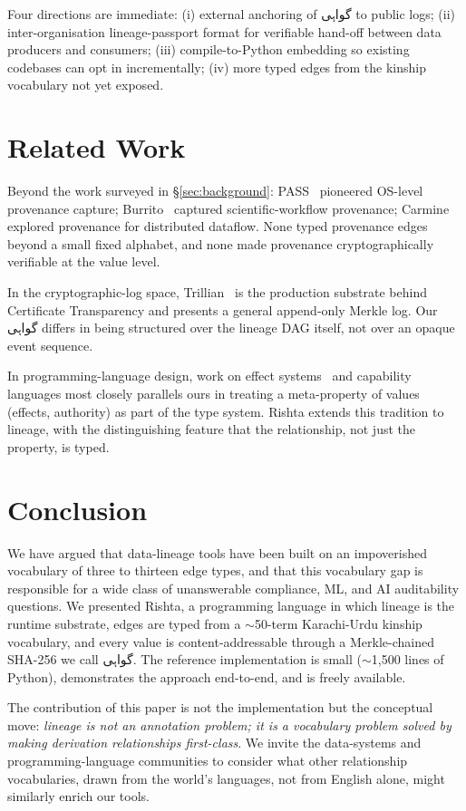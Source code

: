 \documentclass[10pt,twocolumn]{article}
\newcommand{\ur}[1]{{\urdufont #1}}
\begin{document}
Four directions are immediate: (i) external anchoring of \ur{گواہی} to public logs; (ii) inter-organisation lineage-passport format for verifiable hand-off between data producers and consumers; (iii) compile-to-Python embedding so existing codebases can opt in incrementally; (iv) more typed edges from the kinship vocabulary not yet exposed.

\section{Related Work}

Beyond the work surveyed in \S\ref{sec:background}: PASS~\cite{pass} pioneered OS-level provenance capture; Burrito~\cite{burrito} captured scientific-workflow provenance; Carmine~\cite{carmine} explored provenance for distributed dataflow. None typed provenance edges beyond a small fixed alphabet, and none made provenance cryptographically verifiable at the value level.

In the cryptographic-log space, Trillian~\cite{trillian} is the production substrate behind Certificate Transparency and presents a general append-only Merkle log. Our \ur{گواہی} differs in being structured over the lineage DAG itself, not over an opaque event sequence.

In programming-language design, work on effect systems~\cite{koka,frank} and capability languages most closely parallels ours in treating a meta-property of values (effects, authority) as part of the type system. Rishta extends this tradition to lineage, with the distinguishing feature that the relationship, not just the property, is typed.

\section{Conclusion}

We have argued that data-lineage tools have been built on an impoverished vocabulary of three to thirteen edge types, and that this vocabulary gap is responsible for a wide class of unanswerable compliance, ML, and AI auditability questions. We presented Rishta, a programming language in which lineage is the runtime substrate, edges are typed from a $\sim$50-term Karachi-Urdu kinship vocabulary, and every value is content-addressable through a Merkle-chained SHA-256 we call \ur{گواہی}. The reference implementation is small ($\sim$1{,}500 lines of Python), demonstrates the approach end-to-end, and is freely available.

The contribution of this paper is not the implementation but the conceptual move: \emph{lineage is not an annotation problem; it is a vocabulary problem solved by making derivation relationships first-class}. We invite the data-systems and programming-language communities to consider what other relationship vocabularies, drawn from the world's languages, not from English alone, might similarly enrich our tools.

\printbibliography
\end{document}
